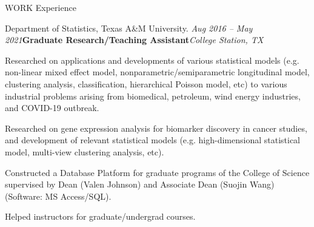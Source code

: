 \documentclass{resume} %
\begin{document}
\begin{rSection}{WORK Experience}
\begin{rSubsection}{
Department of Statistics, Texas A\&M University.
}{\em Aug 2016 -- May 2021}{\textbf{Graduate Research/Teaching Assistant}}{\em College Station, TX}
\item 
Researched on applications and developments of various statistical models (e.g. non-linear mixed effect model, nonparametric/semiparametric longitudinal model, clustering analysis, classification, hierarchical Poisson model, etc) to various industrial problems arising from biomedical, petroleum, wind energy industries, and COVID-19 outbreak.
\item 
Researched on gene expression analysis for biomarker discovery in cancer studies, and development of relevant statistical models (e.g. high-dimensional statistical model, multi-view clustering analysis, etc).
\item 
Constructed a Database Platform for graduate programs of the College of Science supervised by Dean (Valen Johnson) and Associate Dean (Suojin Wang) (Software: MS Access/SQL).
\item 
Helped instructors for graduate/undergrad courses.
\end{rSubsection}


\end{rSection}

\end{document}
